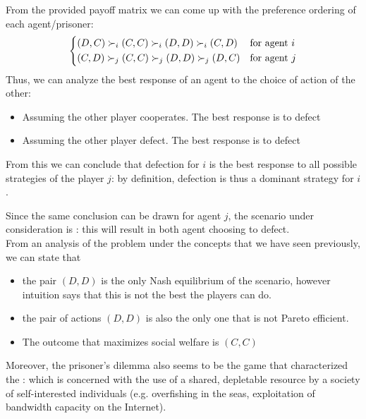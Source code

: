 	From the provided payoff matrix we can come up with the preference ordering of each agent/prisoner:
	\[
	\begin{dcases}
	(D,C) \succ_i (C,C) \succ_i (D,D) \succ_i (C,D) & \text{for agent }i\\
	(C,D) \succ_j (C,C) \succ_j (D,D) \succ_j (D,C) & \text{for agent }j\\
	\end{dcases}
	\]
	Thus, we can analyze the best response of an agent to the choice of action of the other:
	\begin{itemize}
	\item Assuming the other player cooperates. The best response is to defect
	\item Assuming the other player defect. The best response is to defect
	\end{itemize}
	From this we can conclude that defection for $i$ is the best response to all possible strategies of the player $j$: by definition, defection is thus a dominant strategy for $i$.
	
	Since the same conclusion can be drawn for agent $j$, the scenario under consideration is : this will result in both agent choosing to defect.\\
	From an analysis of the problem under the concepts that we have seen previously, we can state that
	\begin{itemize}
	\item the pair $(D,D)$ is the only Nash equilibrium of the scenario, however intuition says that this is not the best the players can do. 		\item the pair of actions $(D,D)$ is also the only one that is not Pareto efficient. 
	\item The outcome that maximizes social welfare is $(C,C)$
	\end{itemize}
	
	 \cite{mastxt}
	
	Moreover, the prisoner’s dilemma also seems to be the game that characterized the : which is concerned with the use of a shared, depletable resource by a society of self-interested individuals (e.g. overfishing in the seas, exploitation of bandwidth capacity on the Internet).
	
